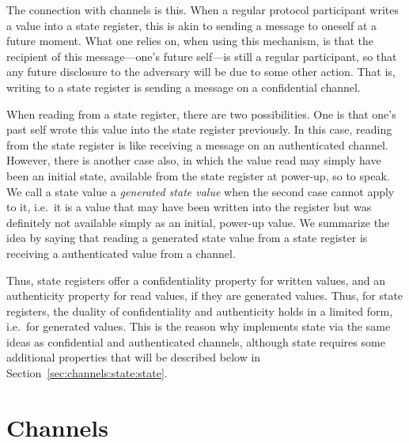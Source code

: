The connection with channels is this.  When a regular protocol
participant writes a value into a state register, this is akin to
sending a message to oneself at a future moment.  What one relies on,
when using this mechanism, is that the recipient of this
message---one's future self---is still a regular participant, so that
any future disclosure to the adversary will be due to some other
action.  That is, writing to a state register is sending a message on
a confidential channel.

When reading from a state register, there are two possibilities.  One
is that one's past self wrote this value into the state register
previously.  In this case, reading from the state register is like
receiving a message on an authenticated channel.  However, there is
another case also, in which the value read may simply have been an
initial state, available from the state register at power-up, so to
speak.  We call a state value a \emph{generated state value} when the
second case cannot apply to it, i.e.~it is a value that may have been
written into the register but was definitely not available simply as
an initial, power-up value.  We summarize the idea by saying that
reading a generated state value from a state register is receiving a
authenticated value from a channel.

Thus, state registers offer a confidentiality property for written
values, and an authenticity property for read values, if they are
generated values.  Thus, for state registers, the duality of
confidentiality and authenticity holds in a limited form, i.e.~for
generated values.  This is the reason why {\cpsa} implements state via
the same ideas as confidential and authenticated channels, although
state requires some additional properties that will be described below
in Section~\ref{sec:channels:state:state}.   

\section{Channels}
\label{sec:channels:state:ch}

